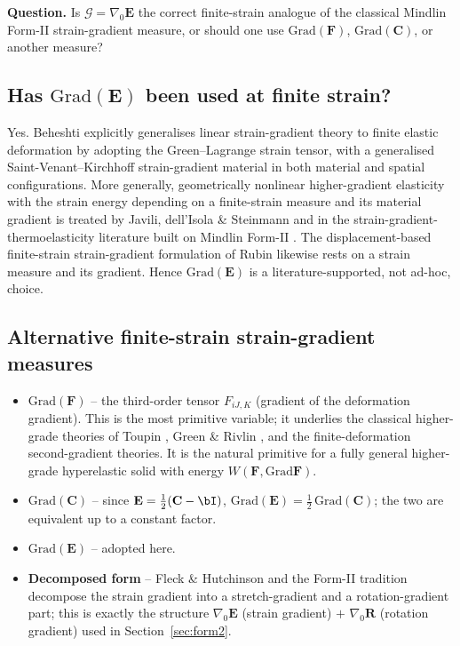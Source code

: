 \documentclass[11pt]{article}
\newcommand{\gradz}{\nabla_{0}}
\newcommand{\bE}{\mathbf{E}}
\newcommand{\bR}{\mathbf{R}}
\newcommand{\gradz}{\nabla_{0}}
\newcommand{\bE}{\mathbf{E}}
\newcommand{\bR}{\mathbf{R}}
\begin{document}
\textbf{Question.} Is $\bm{\mathcal{G}}=\gradz\mathbf{E}$ the correct
finite-strain analogue of the classical Mindlin Form-II strain-gradient
measure, or should one use $\mathrm{Grad}(\mathbf{F})$,
$\mathrm{Grad}(\mathbf{C})$, or another measure?

\subsection{Has $\mathrm{Grad}(\mathbf{E})$ been used at finite strain?}

Yes. Beheshti \cite{Beheshti2016} explicitly generalises linear
strain-gradient theory to finite elastic deformation by adopting the
Green--Lagrange strain tensor, with a generalised
Saint-Venant--Kirchhoff strain-gradient material in both material and
spatial configurations. More generally, geometrically nonlinear
higher-gradient elasticity with the strain energy depending on a
finite-strain measure and its material gradient is treated by Javili,
dell'Isola \& Steinmann
\cite{Javili2013} and in the strain-gradient-thermoelasticity literature
built on Mindlin Form-II \cite{Aouadi2020}. The displacement-based
finite-strain strain-gradient formulation of Rubin \cite{Rubin2008}
likewise rests on a strain measure and its gradient. Hence
$\mathrm{Grad}(\mathbf{E})$ is a literature-supported, not ad-hoc,
choice.

\subsection{Alternative finite-strain strain-gradient measures}

\begin{itemize}
\item \textbf{$\mathrm{Grad}(\mathbf{F})$} -- the third-order tensor
$F_{iJ,K}$ (gradient of the deformation gradient). This is the most
primitive variable; it underlies the classical higher-grade theories of
Toupin \cite{Toupin1962}, Green \& Rivlin \cite{GreenRivlin1964}, and
the finite-deformation second-gradient theories. It is the
natural primitive for a fully general higher-grade hyperelastic solid
with energy $W(\mathbf{F},\mathrm{Grad}\mathbf{F})$.

\item \textbf{$\mathrm{Grad}(\mathbf{C})$} -- since
$\mathbf{E}=\tfrac12(\mathbf{C}-\bI)$, $\mathrm{Grad}(\mathbf{E})
=\tfrac12\,\mathrm{Grad}(\mathbf{C})$; the two are equivalent up to a
constant factor.

\item \textbf{$\mathrm{Grad}(\mathbf{E})$} -- adopted here.

\item \textbf{Decomposed form} -- Fleck \& Hutchinson
\cite{FleckHutchinson1997} and the Form-II tradition decompose the
strain gradient into a stretch-gradient and a rotation-gradient part;
this is exactly the structure $\gradz\bE$ (strain gradient) $+$
$\gradz\bR$ (rotation gradient) used in Section~\ref{sec:form2}.
\end{itemize}
\end{document}
